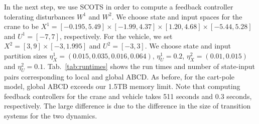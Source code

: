 In the next step, we use SCOTS in order to compute a feedback controller tolerating disturbances $W^1$ and $W^2$. 
We choose state and input spaces for the crane to be $X^{1}=[-0.195,5.49]\times[-1.99,4.37]\times[1.20,4.68]\times[-5.44,5.28]$ and $U^{1}=[-7,7]$, respectively. For the vehicle, we set $X^{2}=[3,9]\times[-3,1.995]$ and $U^{2}=[-3,3]$. %
We choose state and input partition sizes $\eta_{{X}}^{1}=(0.015,0.035,0.016,0.064)$, $\eta_{U}^1=0.2$,  $\eta_{{X}}^2=(0.01,0.015)$ and $\eta_{U}^2=0.1$. %
Tab.~\ref{tab:runtimes} shows the run times and number of state-input pairs corresponding to local and global ABCD. 
As before, for the cart-pole model, global ABCD exceeds our 1.5TB  memory limit. 
Note that computing feedback controllers for the crane and vehicle takes 511 seconds and 0.3 seconds, respectively. 
The large difference is due to the difference in the size of transition systems for the two dynamics. 

			


